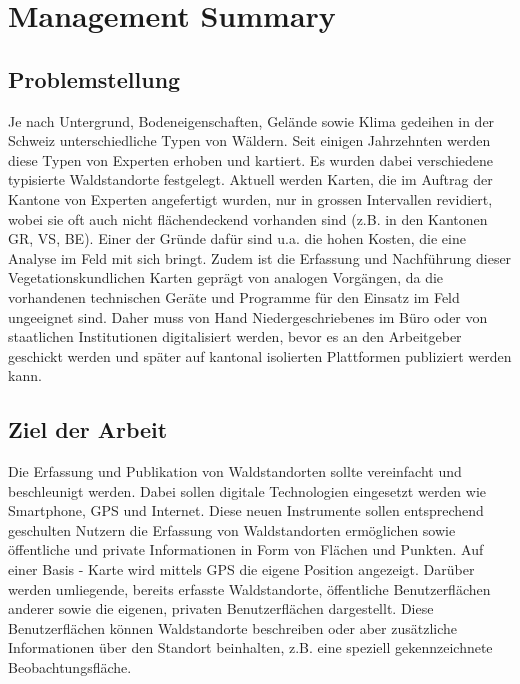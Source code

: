 \renewcommand\thesection{\arabic{section}}
\chapter{Management Summary}
\section{Problemstellung}
Je nach Untergrund, Bodeneigenschaften, Gel\"ande sowie Klima gedeihen in der Schweiz unterschiedliche Typen von W\"aldern. Seit einigen Jahrzehnten werden diese Typen von Experten erhoben und kartiert. Es wurden dabei verschiedene typisierte Waldstandorte festgelegt. Aktuell werden Karten, die im Auftrag der Kantone von Experten angefertigt wurden, nur in grossen Intervallen revidiert, wobei sie oft auch nicht fl\"achendeckend vorhanden sind (z.B. in den Kantonen GR, VS, BE).
Einer der Gr\"unde daf\"ur sind u.a. die hohen Kosten, die eine Analyse im Feld mit sich bringt.
Zudem ist die Erfassung und Nachf\"uhrung dieser Vegetationskundlichen Karten gepr\"agt von analogen Vorg\"angen, da die vorhandenen
technischen Ger\"ate und Programme f\"ur den Einsatz im Feld ungeeignet sind.
Daher muss von Hand Niedergeschriebenes im B\"uro oder von staatlichen Institutionen digitalisiert werden, bevor es an den
Arbeitgeber geschickt werden und sp\"ater auf kantonal isolierten Plattformen publiziert werden kann.

\section{Ziel der Arbeit}
Die Erfassung und Publikation von Waldstandorten sollte vereinfacht und beschleunigt werden. Dabei
sollen digitale Technologien eingesetzt werden wie Smartphone, GPS und Internet. Diese neuen
Instrumente sollen entsprechend geschulten Nutzern die Erfassung von Waldstandorten erm\"oglichen sowie \"offentliche und private Informationen in Form von Fl\"achen und Punkten. Auf einer Basis - Karte wird mittels GPS die eigene
Position angezeigt. Dar\"uber werden umliegende, bereits erfasste Waldstandorte, \"offentliche Benutzerfl\"achen anderer sowie die eigenen, privaten Benutzerfl\"achen dargestellt. Diese Benutzerfl\"achen k\"onnen Waldstandorte beschreiben oder aber zus\"atzliche Informationen \"uber den Standort beinhalten, z.B. eine speziell gekennzeichnete Beobachtungsfl\"ache.

